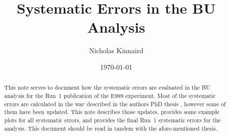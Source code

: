 \documentclass[12pt,letterpaper]{article}
\title{Systematic Errors in the BU Analysis}
\author{Nicholas Kinnaird}
\date{\today}
\begin{document}
\maketitle

\begin{abstract}
	This note serves to document how the systematic errors are evaluated in the BU analysis for the Run~1 publication of the E989 experiment. Most of the systematic errors are calculated in the way described in the authors PhD thesis \cite{phdthesis:2020Kinnaird}, however some of them have been updated. This note describes those updates, provides some example plots for all systematic errors, and provides the final Run~1 systematic errors for the analysis. This document should be read in tandem with the afore-mentioned thesis.
\end{abstract}














\printbibliography

\end{document}
